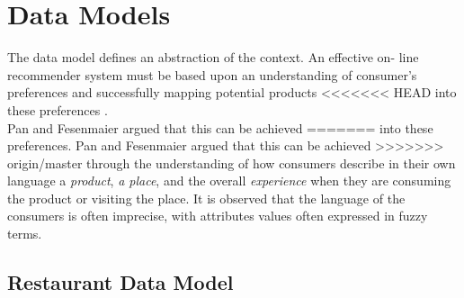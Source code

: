 \section{Data Models}

The data model defines an abstraction of the context. An effective on-
line  recommender system must be based upon an understanding of
consumer's  preferences and successfully mapping potential products
<<<<<<< HEAD
into these preferences  \cite{adomavicius2011context}. \\ Pan and
Fesenmaier  \cite{pan2006online} argued that this can be achieved
=======
into these preferences\cite{adomavicius2011context}. Pan and
Fesenmaier\cite{pan2006online} argued that this can be achieved
>>>>>>> origin/master
through the understanding of  how consumers describe in their own
language a \textit{product}, \textit{a place}, and the overall
\textit{experience}  when they are consuming the product or visiting
the place.  It is observed that  the language of the consumers is
often imprecise,  with attributes values often expressed in fuzzy
terms. 

\subsection{Restaurant Data Model}

